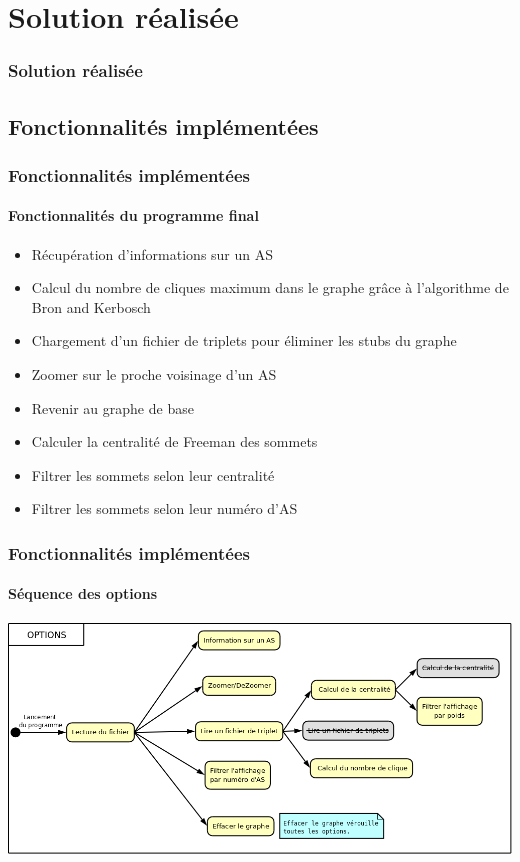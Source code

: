\section{Solution r\'ealis\'ee}

\begin{frame}
 	\frametitle{Solution r\'ealis\'ee}
\end{frame}

\subsection{Fonctionnalit\'es impl\'ement\'ees}
\frame
{
\frametitle{Fonctionnalit\'es impl\'ement\'ees}
\framesubtitle{Fonctionnalit\'es du programme final}
\begin{itemize}
 \item<1-8> R\'ecup\'eration d'informations sur un AS
 \item<2-8> Calcul du nombre de cliques maximum dans le graphe gr\^ace \`a l'algorithme de Bron and Kerbosch
 \item<3-8> Chargement d'un fichier de triplets pour \'eliminer les stubs du graphe
 \item<4-8> Zoomer sur le proche voisinage d'un AS
 \item<5-8> Revenir au graphe de base
 \item<6-8> Calculer la centralit\'e de Freeman des sommets
 \item<7> Filtrer les sommets selon leur centralit\'e
 \item<7> Filtrer les sommets selon leur num\'ero d'AS
\end{itemize}
}
\frame
{
\frametitle{Fonctionnalit\'es impl\'ement\'ees}
\framesubtitle{S\'equence des options}
\includegraphics[width=\textwidth]{./seqMenu.png}
}

